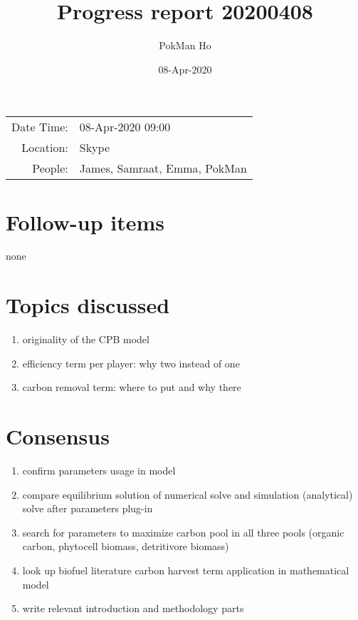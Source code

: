 \documentclass[a4paper,11pt]{article}
\title{Progress report 20200408}
\author{PokMan Ho}
\date{08-Apr-2020}
\begin{document}
    \maketitle
    
    \begin{tabular}{rl}
        Date Time: & 08-Apr-2020 09:00 \\
        Location: & Skype \\
        People: & James, Samraat, Emma, PokMan \\
    \end{tabular}
    
    \section{Follow-up items}
    none
    
    \section{Topics discussed}
    \begin{enumerate}
        \item originality of the CPB model
        \item efficiency term per player: why two instead of one
        \item carbon removal term: where to put and why there
    \end{enumerate}
    
    \section{Consensus}
    \begin{enumerate}
        \item confirm parameters usage in model
        \item compare equilibrium solution of numerical solve and simulation (analytical) solve after parameters plug-in
        \item search for parameters to maximize carbon pool in all three pools (organic carbon, phytocell biomass, detritivore biomass)
        \item look up biofuel literature carbon harvest term application in mathematical model
        \item write relevant introduction and methodology parts
    \end{enumerate}
\end{document}

